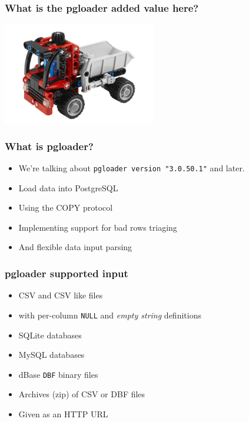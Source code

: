 \documentclass{beamer}
\begin{document}
\begin{frame}[fragile]
  \frametitle{What is the pgloader added value here?}
  
  \vfill

\begin{center}
  \includegraphics[height=12em]{toy-loader.jpg}
\end{center}
\end{frame}

\begin{frame}[fragile]
  \frametitle{What is pgloader?}
  
  \vfill

  \begin{itemize}
  \item We're talking about \texttt{pgloader version "3.0.50.1"} and later.
  \item Load data into PostgreSQL
  \item Using the COPY protocol
  \item Implementing support for bad rows triaging
  \item And flexible data input parsing
  \end{itemize}  
\end{frame}

\begin{frame}[fragile]
  \frametitle{pgloader supported input}
  
  \vfill

  \begin{itemize}
  \item CSV and CSV like files
  \item with per-column \texttt{NULL} and \textit{empty string} definitions
  \item SQLite databases
  \item MySQL databases
  \item dBase \texttt{DBF} binary files
  \item Archives (zip) of CSV or DBF files
  \item Given as an HTTP URL
  \end{itemize}  
\end{frame}
\end{document}
